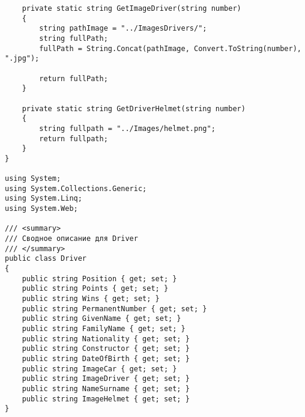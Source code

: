 \documentclass[14pt,a4paper]{extreport}
\begin{document}
\begin{landscape}
\begin{lstlisting}
    private static string GetImageDriver(string number)
    {
        string pathImage = "../ImagesDrivers/";
        string fullPath;
        fullPath = String.Concat(pathImage, Convert.ToString(number), ".jpg");

        return fullPath;
    }

    private static string GetDriverHelmet(string number)
    {
        string fullpath = "../Images/helmet.png";
        return fullpath;
    }
}   

using System;
using System.Collections.Generic;
using System.Linq;
using System.Web;

/// <summary>
/// Сводное описание для Driver
/// </summary>
public class Driver
{
    public string Position { get; set; }
    public string Points { get; set; }
    public string Wins { get; set; }
    public string PermanentNumber { get; set; }
    public string GivenName { get; set; }
    public string FamilyName { get; set; }
    public string Nationality { get; set; }
    public string Constructor { get; set; }
    public string DateOfBirth { get; set; }
    public string ImageCar { get; set; }
    public string ImageDriver { get; set; }
    public string NameSurname { get; set; }
    public string ImageHelmet { get; set; }
}	
	
	\end{lstlisting}
	\end{landscape}
	
	
\end{document}
